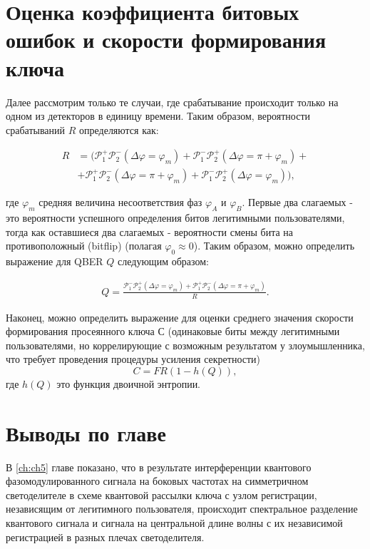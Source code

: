 \pagebreak

\section{Оценка коэффициента битовых ошибок и скорости формирования ключа} \label{ch:ch5/sect8}

Далее рассмотрим только те случаи, где срабатывание происходит только на одном из детекторов в единицу времени.  Таким образом, вероятности срабатываний $R$ определяются как:

\begin{align}
    R&=\Big(\mathcal{P}_{1}^{+}\mathcal{P}_{2}^{-}(\Delta\varphi=\varphi_m)+\mathcal{P}_{1}^{-}\mathcal{P}_{2}^{+}(\Delta\varphi=\pi+\varphi_m)+ \nonumber \\
    &+\mathcal{P}_{1}^{+}\mathcal{P}_{2}^{-}(\Delta\varphi=\pi+\varphi_m)+\mathcal{P}_{1}^{-}\mathcal{P}_{2}^{+}(\Delta\varphi=\varphi_m)\Big),
\end{align}


где $\varphi_m$ средняя величина несоответствия фаз $\varphi_A$ и $\varphi_B$. Первые два слагаемых - это вероятности успешного определения битов легитимными пользователями, тогда как оставшиеся два слагаемых - вероятности смены бита на противоположный (bitflip) (полагая $\varphi_0 \approx 0$). Таким образом, можно определить выражение для QBER $Q$ следующим образом:

\begin{align}
    Q=\frac{\mathcal{P}_{1}^{-}\mathcal{P}_{2}^{+}(\Delta\varphi=\varphi_m)+\mathcal{P}_{1}^{+}\mathcal{P}_{2}^{-}(\Delta\varphi=\pi+\varphi_m)}{R}.
\end{align}


Наконец, можно определить выражение для оценки среднего значения скорости формирования просеянного ключа $С$ (одинаковые биты между легитимными пользователями, но коррелирующие с возможным результатом у злоумышленника, что требует проведения процедуры усиления секретности)
\begin{equation}
    C=FR(1-h(Q)),
\end{equation}
где $h(Q)$ это функция двоичной энтропии. 

\pagebreak

\section{Выводы по главе} \label{ch:ch5/sec9}


В \ref{ch:ch5} главе показано, что в результате интерференции квантового фазомодулированного сигнала на боковых частотах на симметричном светоделителе в схеме квантовой рассылки ключа с узлом регистрации, независящим от легитимного пользователя, происходит спектральное разделение квантового сигнала и сигнала на центральной длине волны с их независимой регистрацией в разных плечах светоделителя. 

\pagebreak


